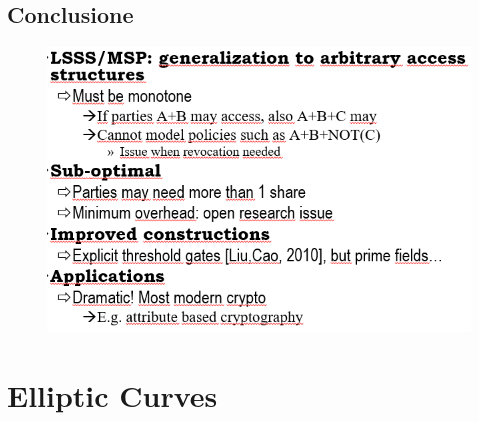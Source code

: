 \documentclass{book}
\begin{document}
\section{Conclusione}
\begin{figure}[th]
    \centering
    \includegraphics[scale=1]{2022-01-08-19-39-12.png}%
\end{figure}
\chapter{Elliptic Curves}
\end{document}
